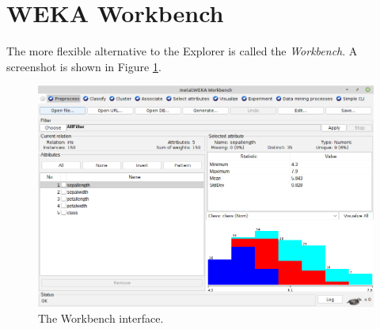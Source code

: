 \clearpage
\section{WEKA Workbench}
The more flexible alternative to the Explorer is called the \textit{Workbench}.
A screenshot is shown in Figure \ref{workbench}.

\begin{figure}[htb]
  \centering
  \includegraphics[width=12.0cm]{images/workbench.png}
  \caption{The Workbench interface.}
  \label{workbench}
\end{figure}

